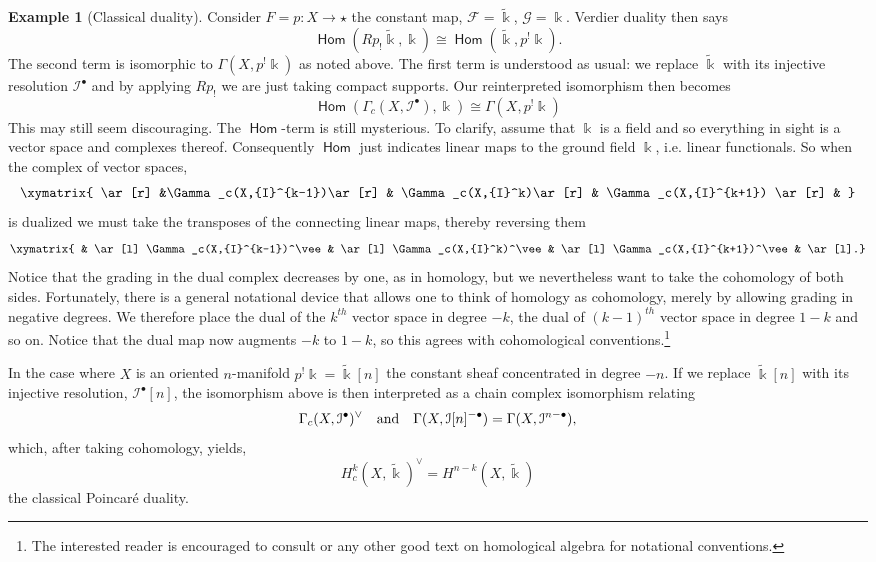 \documentclass{psapm-l}
\theoremstyle{definition}
\newtheorem{example}[theorem]{Example}
\theoremstyle{remark}
\numberwithin{equation}{section}
\begin{document}
\begin{example}[Classical duality]
Consider $F=p\colon X\to\star$ the constant map, ${{\mathcal F}}=\tilde{{\Bbbk}}$, $\mathcal{G}={{\Bbbk}}$. Verdier duality then says
\[
       {{{\operatorname{\mathsf{{Hom}}}}}}(Rp_!\tilde{{\Bbbk}},{{\Bbbk}})\cong{{{\operatorname{\mathsf{{Hom}}}}}}(\tilde{{\Bbbk}},p^!{{\Bbbk}}).
\]
The second term is isomorphic to $\Gamma(X,p^!{{\Bbbk}})$ as noted above. The first term is understood as usual: we replace $\tilde{{\Bbbk}}$ with its injective resolution $\mathcal{I}^{\bullet}$ and by applying $Rp_!$ we are just taking compact supports. Our reinterpreted isomorphism then becomes
\[
       {{{\operatorname{\mathsf{{Hom}}}}}}(\Gamma_c(X,\mathcal{I}^{\bullet}),{{\Bbbk}})\cong \Gamma(X,p^!{{\Bbbk}})
\]
This may still seem discouraging. The ${{{\operatorname{\mathsf{{Hom}}}}}}$-term is still mysterious. To clarify, assume that ${{\Bbbk}}$ is a field and so everything in sight is a vector space and complexes thereof. Consequently ${{{\operatorname{\mathsf{{Hom}}}}}}$ just indicates linear maps to the ground field ${{\Bbbk}}$, i.e. linear functionals. So when the complex of vector spaces,
\[
\xymatrix{
    \ar[r] &\Gamma_c(X,{I}^{k-1})\ar[r] & \Gamma_c(X,{I}^k)\ar[r] & \Gamma_c(X,{I}^{k+1}) \ar[r] &
    }
\]
is dualized we must take the transposes of the connecting linear maps, thereby reversing them
\[
\xymatrix{ & \ar[l] \Gamma_c(X,{I}^{k-1})^\vee & \ar[l]
\Gamma_c(X,{I}^k)^\vee & \ar[l]  \Gamma_c(X,{I}^{k+1})^\vee & \ar[l].}
\]
Notice that the grading in the dual complex decreases by one, as in homology, but we nevertheless want to take the cohomology of both sides. Fortunately, there is a general notational device that allows one to think of homology as cohomology, merely by allowing grading in negative degrees. We therefore place the dual of the $k^{th}$ vector space in degree $-k$, the dual of $(k-1)^{th}$ vector space in degree $1-k$ and so on. Notice that the dual map now augments $-k$ to $1-k$, so this agrees with cohomological conventions.\footnote{The interested reader is encouraged to consult \cite{GelfandManin} or any other good text on homological algebra for notational conventions.}

In the case where $X$ is an oriented $n$-manifold $p^!{{\Bbbk}}=\tilde{{\Bbbk}}[n]$ the constant sheaf concentrated in degree $-n$. If we replace $\widetilde{{\Bbbk}}[n]$ with its injective resolution, $\mathcal{I}^{\bullet}[n]$, the isomorphism above is then interpreted as a chain complex isomorphism relating
\[
        \Gamma_c(X,\mathcal{I}^{\bullet})^{\vee}
    \quad {\rm and } \quad
        \Gamma(X,\mathcal{I}[n]^{-\bullet})
        =
        \Gamma(X,\mathcal{I}^{n-\bullet}),
\]
which, after taking cohomology, yields,
\[
       H^k_c(X,\tilde{{\Bbbk}})^\vee=H^{n-k}(X,\tilde{{\Bbbk}})
\]
the classical Poincar\'e duality.
\end{example}
\end{document}
